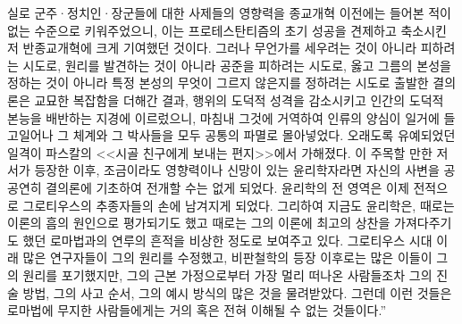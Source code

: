 실로
군주^^b7정치인^^b7장군들에 대한
사제들의
영향력을
종교개혁 이전에는 들어본 적이 없는 수준으로
키워주었으니, 이는
프로테스탄티즘의 초기 성공을 견제하고 축소시킨
저 반종교개혁에 크게 기여했던 것이다.
그러나 무언가를 세우려는 것이 아니라 피하려는 시도로,
원리를 발견하는 것이 아니라 공준을 피하려는 시도로,
옳고 그름의 본성을 정하는 것이 아니라
특정 본성의 무엇이 그르지 않은지를 정하려는 시도로
출발한 결의론은
교묘한 복잡함을 더해간 결과,
행위의 도덕적 성격을 감소시키고
인간의 도덕적 본능을 배반하는 지경에 이르렀으니,
마침내 그것에 거역하여 인류의 양심이 일거에 들고일어나
그 체계와 그 박사들을 모두 공통의 파멸로 몰아넣었다.
오래도록 유예되었던 일격이 파스칼의
<<시골 친구에게 보내는 편지>>에서
가해졌다.
이 주목할 만한 저서가 등장한 이후,
조금이라도 영향력이나 신망이 있는 윤리학자라면
자신의 사변을 공공연히 결의론에 기초하여 전개할 수는 없게 되었다.
윤리학의 전 영역은 이제 전적으로
그로티우스의 추종자들의 손에 남겨지게 되었다.
그리하여 지금도 윤리학은,
때로는  이론의 흠의 원인으로 평가되기도 했고
때로는 그의 이론에 최고의 상찬을 가져다주기도 했던
로마법과의 연루의 흔적을
비상한 정도로 보여주고 있다.
그로티우스 시대 이래 많은 연구자들이 그의 원리를 수정했고,
비판철학의 등장 이후로는 많은 이들이 그의 원리를 포기했지만,
그의 근본 가정으로부터 가장 멀리 떠나온 사람들조차
그의 진술 방법, 그의 사고 순서, 그의 예시 방식의 많은 것을
물려받았다.
그런데 이런 것들은 로마법에 무지한 사람들에게는 거의 혹은 전혀
이해될 수 없는 것들이다.''

